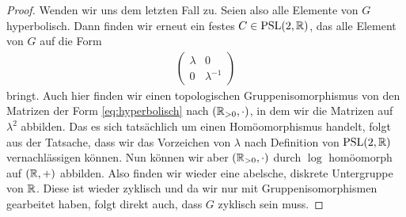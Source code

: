 \begin{proof}
  Wenden wir uns dem letzten Fall zu. Seien also alle Elemente von $G$
  hyperbolisch. Dann finden wir erneut ein festes $C \in \operatorname{PSL}(2, \mathbb{R})$,
  das alle Element von $G$ auf die Form
  \begin{align}
    \label{eq:hyperbolisch}
  \begin{pmatrix}
    \lambda & 0 \\
    0 & \lambda^{-1}
  \end{pmatrix}
  \end{align}
  bringt. Auch hier finden wir einen topologischen
  Gruppenisomorphismus von den Matrizen
  der Form \eqref{eq:hyperbolisch} nach $(\mathbb{R}_{> 0}, \cdot)$, in
  dem wir die Matrizen auf $\lambda^2$ abbilden. Das es sich
  tatsächlich um einen Homöomorphismus handelt, folgt aus der
  Tatsache, dass wir das Vorzeichen von $\lambda$ nach Definition von
  $\operatorname{PSL}(2, \mathbb{R})$ vernachlässigen können. Nun können wir aber $(\mathbb{R}_{>
    0}, \cdot)$
  durch $\log$ homöomorph auf $(\mathbb{R},+)$ abbilden. Also finden wir wieder
  eine abelsche, diskrete Untergruppe von $\mathbb{R}$. Diese ist wieder
  zyklisch und da wir nur mit Gruppenisomorphismen gearbeitet haben, folgt
  direkt auch, dass $G$ zyklisch sein muss.
\end{proof}

